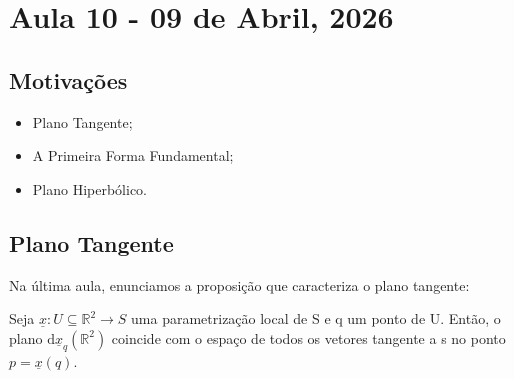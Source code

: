 \documentclass[../differential_geometry.tex]{subfiles}
\begin{document}
\section{Aula 10 - 09 de Abril, 2026}
\subsection{Motivações}
\begin{itemize}
	\item Plano Tangente;
	\item A Primeira Forma Fundamental;
	\item Plano Hiperbólico.
\end{itemize}
\subsection{Plano Tangente}
Na última aula, enunciamos a proposição que caracteriza o plano tangente:
\begin{prop*}
	Seja \(\underline{x}:U\subseteq \mathbb{R}^{2}\rightarrow S\) uma parametrização local de S e q um ponto de U. Então, o plano \(\mathrm{d}\underline{x}_{q}(\mathbb{R}^{2})\) coincide com o espaço de todos os vetores tangente a s no ponto \(p = \underline{x}(q)\).
\end{prop*}
\end{document}
